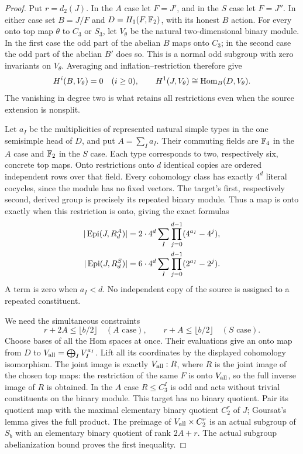 \begin{proof}
Put $r=d_2(J)$. In the $A$ case let $F=J'$, and in the $S$ case let
$F=J''$. In either case set $B=J/F$ and $D=H_1(F,\mathbb F_2)$, with its
honest $B$ action. For every onto top map $\theta$ to $C_3$ or $S_3$,
let $V_\theta$ be the natural two-dimensional binary module. In the
first case the odd part of the abelian $B$ maps onto $C_3$; in the
second case the odd part of the abelian $B'$ does so. This is a normal
odd subgroup with zero invariants on $V_\theta$. Averaging and
inflation--restriction therefore give
\[
 H^i(B,V_\theta)=0\quad(i\geq0),\qquad
 H^1(J,V_\theta)\cong\operatorname{Hom}_B(D,V_\theta).
\]
The vanishing in degree two is what retains all restrictions even
when the source extension is nonsplit.

Let $a_I$ be the multiplicities of represented natural simple types
in the one semisimple head of $D$, and put $A=\sum_Ia_I$.
Their commuting fields are $\mathbb F_4$ in the $A$ case and $\mathbb F_2$ in
the $S$ case. Each type corresponds to two, respectively six, concrete
top maps. Onto restrictions onto $d$ identical copies are ordered
independent rows over that field. Every cohomology class has exactly
$4^d$ literal cocycles, since the module has no fixed vectors.
The target's first, respectively second, derived group is precisely
its repeated binary module. Thus a map is onto exactly when this
restriction is onto, giving the exact formulas
\begin{align}
 |\operatorname{Epi}(J,R_d^A)|&=2\cdot4^d\sum_I\prod_{j=0}^{d-1}(4^{a_I}-4^j),
 \label{eq:repeated-a}\\
 |\operatorname{Epi}(J,R_d^S)|&=6\cdot4^d\sum_I\prod_{j=0}^{d-1}(2^{a_I}-2^j).
 \label{eq:repeated-s}
\end{align}
A term is zero when $a_I<d$. No independent copy of the source is
assigned to a repeated constituent.

We need the simultaneous constraints
\begin{equation}\label{eq:joint-natural-facets}
 r+2A\leq\lfloor b/2\rfloor\quad(A\text{ case}),\qquad
 r+A\leq\lfloor b/2\rfloor\quad(S\text{ case}).
\end{equation}
Choose bases of all the Hom spaces at once. Their evaluations give
an onto map from $D$ to $V_{\rm all}=\bigoplus_I V_I^{a_I}$.
Lift all its coordinates by the displayed cohomology isomorphism.
The joint image is exactly $V_{\rm all}:R$, where $R$ is the joint
image of the chosen top maps: the restriction of the same $F$ is
onto $V_{\rm all}$, so the full inverse image of $R$ is obtained.
In the $A$ case $R\leq C_3^I$ is odd and acts without trivial
constituents on the binary module. This target has no binary quotient.
Pair its quotient map with the maximal elementary binary quotient
$C_2^r$ of $J$; Goursat's lemma gives the full product. The preimage
of $V_{\rm all}\times C_2^r$ is an actual subgroup of $S_b$ with
an elementary binary quotient of rank $2A+r$. The actual subgroup
abelianization bound \cite[Theorem 2.8]{RoneyDougalTracey2025}
proves the first inequality.


\end{proof}
